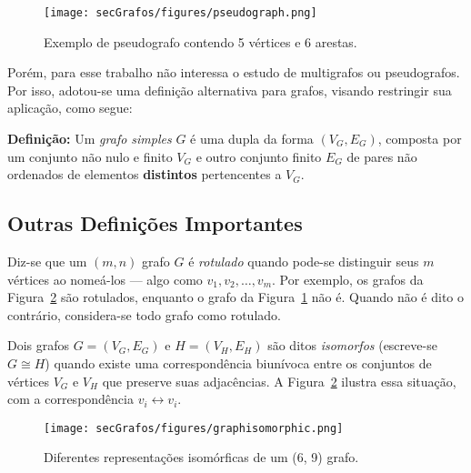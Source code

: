 \begin{figure}[H]
	\begin{center}
		\texttt{[image: secGrafos/figures/pseudograph.png]}
	\end{center}
	\caption{Exemplo de pseudografo contendo 5 vértices e 6 arestas.}
	\label{fig:pseudograph}
\end{figure}

Porém, para esse trabalho não interessa o estudo de multigrafos ou pseudografos. Por isso, adotou-se uma definição alternativa para grafos, visando restringir sua aplicação, como segue:

\begin{center}
	\begin{minipage}{0.9 \linewidth}
		\textbf{Definição:} Um \textit{grafo simples} $G$ é uma dupla da forma $(V_G,E_G)$, composta por um conjunto não nulo e finito $V_G$ e outro conjunto finito $E_G$ de pares não ordenados de elementos \textbf{distintos} pertencentes a $V_G$.
	\end{minipage}
\end{center} 

\subsection{Outras Definições Importantes}

Diz-se que um $(m,n)$ grafo $G$ é \textit{rotulado} quando pode-se distinguir seus $m$ vértices ao nomeá-los --- algo como $v_1, v_2, \dots, v_m$. Por exemplo, os grafos da Figura~\ref{fig:graphisomorphic} são rotulados, enquanto o grafo da Figura~\ref{fig:pseudograph} não é. Quando não é dito o contrário, considera-se todo grafo como rotulado.

Dois grafos $G = (V_G, E_G)$ e $H = (V_H, E_H)$ são ditos \textit{isomorfos} (escreve-se $G \cong H$) quando existe uma correspondência biunívoca entre os conjuntos de vértices $V_G$ e $V_H$ que preserve suas adjacências. A Figura~\ref{fig:graphisomorphic} ilustra essa situação, com a correspondência $v_i \longleftrightarrow v_i$.

\begin{figure}[H]
	\begin{center}
		\texttt{[image: secGrafos/figures/graphisomorphic.png]}
	\end{center}
	\caption{Diferentes representações isomórficas de um (6, 9) grafo.}
	\label{fig:graphisomorphic}
\end{figure}


